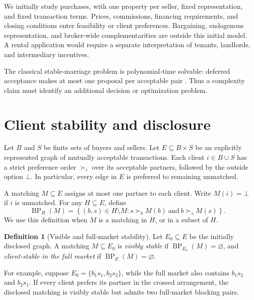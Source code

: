 \documentclass[11pt,letterpaper]{article}
\theoremstyle{definition}
\newtheorem{definition}[theorem]{Definition}
\theoremstyle{remark}
\newcommand{\BP}{\operatorname{BP}}
\newcommand{\botv}{\bot}
\begin{document}
We initially study purchases, with one property per seller, fixed representation,
and fixed transaction terms. Prices, commissions, financing requirements, and
closing conditions enter feasibility or client preferences. Bargaining,
endogenous representation, and broker-wide complementarities are outside this
initial model. A rental application would require a separate interpretation of
tenants, landlords, and intermediary incentives.

The classical stable-marriage problem is polynomial-time solvable:
deferred acceptance makes at most one proposal per acceptable pair
\cite{gale1962}. Thus a complexity claim must identify an additional decision or
optimization problem.

\section{Client stability and disclosure}

Let \(B\) and \(S\) be finite sets of buyers and sellers. Let
\(E\subseteq B\times S\) be an explicitly represented graph of mutually
acceptable transactions. Each client \(i\in B\cup S\) has a strict preference
order \(\succ_i\) over its acceptable partners, followed by the outside option
\(\botv\). In particular, every edge in \(E\) is preferred to remaining unmatched.

A matching \(M\subseteq E\) assigns at most one partner to each client.
Write \(M(i)=\botv\) if \(i\) is unmatched. For any \(H\subseteq E\), define
\begin{equation}
\BP_H(M)=
\left\{(b,s)\in H\setminus M:
s\succ_b M(b)\ \text{and}\ b\succ_s M(s)
\right\}.
\label{eq:blocking}
\end{equation}
We use this definition when \(M\) is a matching in \(H\), or in a subset of \(H\).

\begin{definition}[Visible and full-market stability]
Let \(E_0\subseteq E\) be the initially disclosed graph.
A matching \(M\subseteq E_0\) is \emph{visibly stable} if
\(\BP_{E_0}(M)=\varnothing\), and \emph{client-stable in the full market} if
\(\BP_E(M)=\varnothing\).
\end{definition}

For example, suppose \(E_0=\{b_1s_1,b_2s_2\}\), while the full market also
contains \(b_1s_2\) and \(b_2s_1\). If every client prefers its partner in the
crossed arrangement, the disclosed matching is visibly stable but admits two
full-market blocking pairs.
\end{document}
